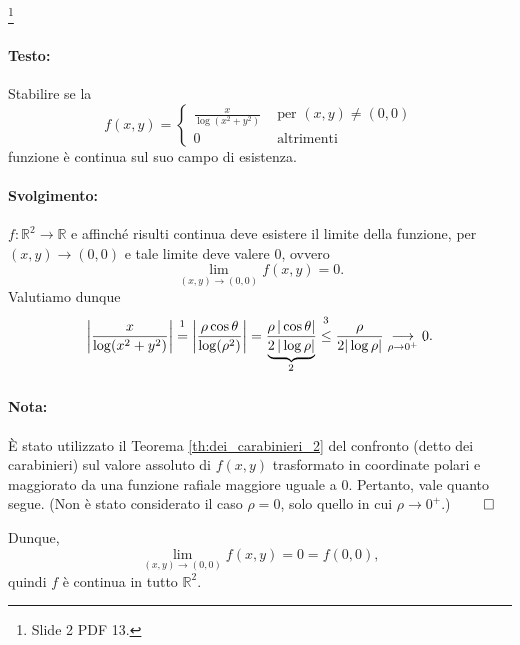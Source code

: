 \begin{example}\footnote{Slide 2 PDF 13.}
	\paragraph{Testo:} Stabilire se la
	\begin{equation*}
		f(x,y)=
		\begin{cases}
			\frac{x}{\log(x^2+y^2)}&\text{ per } (x,y)\neq(0,0)\\
			0 &\text{ altrimenti}
		\end{cases}
	\end{equation*}
	funzione è continua sul suo campo di esistenza.
	\paragraph{Svolgimento:} $f:\mathbb{R}^2\rightarrow\mathbb{R}$ e affinché risulti continua deve esistere il limite della funzione, per $(x,y)\rightarrow(0,0)$ e tale limite deve valere 0, ovvero
	\begin{equation*}
		\lim_{(x,y)\rightarrow(0,0)}f(x,y)=0.
	\end{equation*}
	Valutiamo dunque
	\begin{equation*}
		\left|\frac{x}{\log(x^2+y^2)}\right|\overset{\footnotemark}{=} \left|\frac{\rho \cos\theta}{\log(\rho^2)}\right| = \frac{\rho\,|\cos\theta|}{\underbrace{2\,|\log\rho|}_{\footnotemark}}\overset{\footnotemark}{\leq} \frac{\rho}{2|\log\rho|}\underset{\rho\rightarrow0^+}{\longrightarrow}0 .
	\end{equation*}
	\addtocounter{footnote}{-2}
	
	
	
	\paragraph{Nota:} È stato utilizzato il Teorema \ref{th:dei_carabinieri_2} del confronto (detto dei carabinieri) sul valore assoluto di $f(x,y)$ trasformato in coordinate polari e maggiorato da una funzione rafiale maggiore uguale a 0. Pertanto, vale quanto segue. (Non è stato considerato il caso $\rho=0$, solo quello in cui $\rho\rightarrow 0^+$.) $\qed$
	
	\noindent Dunque,
	\begin{equation*}
		\lim_{(x,y)\rightarrow(0,0)} f(x,y) = 0 = f(0,0),
	\end{equation*}
	quindi $f$ è continua in tutto $\mathbb{R}^2$.
	
\end{example}

